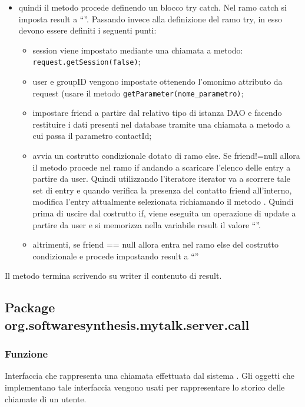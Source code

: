\begin{description}
\begin{itemize}
		\item quindi il metodo procede definendo un blocco try catch. Nel ramo catch si imposta result a ``''. Passando invece alla definizione del ramo try, in esso devono essere definiti i seguenti punti:
		\begin{itemize}
			\item session viene impostato mediante una chiamata a metodo:
			\verb|request.getSession(false)|;
			\item user e groupID vengono impostate ottenendo l'omonimo attributo da request (usare il metodo \texttt{getParameter(nome\_parametro)};
			\item impostare friend a partire dal relativo tipo di istanza DAO e facendo restituire i dati presenti nel database tramite una chiamata a metodo  a cui passa il parametro contactId;
			\item avvia un costrutto condizionale dotato di ramo else. Se friend!=null allora il metodo procede nel ramo if andando a scaricare l'elenco delle entry a partire da user. Quindi utilizzando l'iteratore iterator va a scorrere tale set di entry e quando verifica la presenza del contatto friend all'interno, modifica l'entry attualmente selezionata richiamando il metodo . Quindi prima di uscire dal costrutto if, viene eseguita un operazione di update a partire da user e si memorizza nella variabile result il valore ``''.
			\item altrimenti, se friend == null allora entra nel ramo else del costrutto condizionale e procede impostando result a ``''
		\end{itemize}
	\end{itemize}
	Il metodo termina scrivendo su writer il contenuto di result.
	
\end{description}

\subsection{Package org.softwaresynthesis.mytalk.server.call}\label{sec:call}


\subsubsection*{Funzione}
Interfaccia che rappresenta una chiamata effettuata dal sistema \caName. Gli oggetti che implementano tale interfaccia vengono usati per rappresentare lo storico delle chiamate di un utente.

